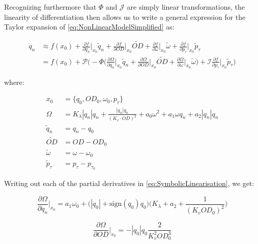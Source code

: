 Recognizing furthermore that $\Phi$ and $\mathcal{J}$ are simply linear transformations, the linearity of differentiation then allows us to write a general expression for the Taylor expansion of \cref{eq:NonLinearModelSimplified} as:

\begin{equation}\label{eq:SymbolicLinearisation}
	\begin{split}
		\dot{q}_n &\approx f(x_0) + \frac{\partial f}{\partial q_n}\bigg\rvert_{x_0} \tilde{q}_n + \frac{\partial f}{\partial OD}\bigg\rvert_{x_0} \tilde{OD} + \frac{\partial f}{\partial \omega}\bigg\rvert_{x_0} \tilde{\omega} +  \frac{\partial f}{\partial p_\tau}\bigg\rvert_{x_0} \tilde{p}_\tau
		\\
		&= f(x_0) + \mathcal{P}\Big(-\Phi\Big( \frac{\partial \Omega}{\partial q_n}\bigg\rvert_{x_0} \tilde{q}_n + \frac{\partial \Omega}{\partial OD}\bigg\rvert_{x_0} \tilde{OD} + \frac{\partial \Omega}{\partial \omega}\bigg\rvert_{x_0} \tilde{\omega} \Big) + \mathcal{I} \frac{\partial f}{\partial p_\tau}\bigg\rvert_{x_0} \tilde{p}_\tau \Big)
	\end{split}
\end{equation}

where: 

\begin{align}
	x_0 &= \{q_0,OD_0,\omega_0, p_\tau \} \label{eq:EquilibriumPoint} \\
	\Omega &= K_\lambda|q_n|q_n+\frac{|q_n|q_n}{(K_v\cdot OD)^2}+a_0\omega^2+a_1\omega q_n+a_2|q_n|q_n \label{eq:OmegaFun} \\
	\tilde{q}_n &= q_n - q_0 \label{eq:QTilde} \\
	\tilde{OD} &= OD - OD_0 \label{eq:ODTilde} \\ 
	\tilde{\omega} &= \omega - \omega_0 \label{eq:OmegaTilde} \\
	\tilde{p}_\tau &= p_\tau - p_{\tau_0}
\end{align}

Writing out each of the partial derivatives in \cref{eq:SymbolicLinearisation}, we get:

\begin{equation}\label{eq:PartialTaylorQ}
	\frac{\partial \Omega}{\partial q_n}\bigg\rvert_{x_0} 
	=
	a_1\omega_0 + \Big(|q_0|+ \text{sign}(q_0)q_0\Big)\Bigg(K_\lambda + a_2 + \frac{1}{(K_v OD_0)^2}\Bigg) 
\end{equation}

\begin{equation}\label{eq:PartialTaylorOD}
	\frac{\partial \Omega}{\partial OD}\bigg\rvert_{x_0} 
	=
	-|q_0|q_0 \frac{2}{K_v^2 OD_0^3}
\end{equation}

